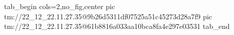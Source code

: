  
 
 
 
 

\qqSecOrig


\ifcmt
  tab_begin cols=2,no_fig,center
    pic tm://22_12_22.11.27.35@9b26d5311df07525a51c45273d28a7f9
    pic tm://22_12_22.11.27.35@61b8816a033aa10bca8fa4e297e03531
  tab_end
\fi

